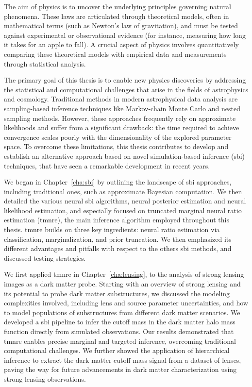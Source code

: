 The aim of physics is to uncover the underlying principles governing natural phenomena. These laws are articulated through theoretical models, often in mathematical terms (such as Newton’s law of gravitation), and must be tested against experimental or observational evidence (for instance, measuring how long it takes for an apple to fall). A crucial aspect of physics involves quantitatively comparing these theoretical models with empirical data and measurements through statistical analysis. 

The primary goal of this thesis is to enable new physics discoveries by addressing the statistical and computational challenges that arise in the fields of astrophysics and cosmology. 
Traditional methods in modern astrophysical data analysis are sampling-based inference techniques like Markov-chain Monte Carlo and nested sampling methods. However, these approaches frequently rely on approximate likelihoods and suffer from a significant drawback: the time required to achieve convergence scales poorly with the dimensionality of the explored parameter space. To overcome these limitations, this thesis contributes to develop and establish an alternative approach based on novel simulation-based inference (\gls*{sbi}) techniques, that have seen a remarkable development in recent years. 

We began in Chapter~\ref{cha:sbi} by outlining the landscape of \gls*{sbi} approaches, including traditional ones, such as approximate Bayesian computation. We then detailed the various neural \gls*{sbi} algorithms, neural posterior estimation and neural likelihood estimation, and especially focused on truncated marginal neural ratio estimation (\gls*{tmnre}), the main inference algorithm employed throughout this thesis. \Gls*{tmnre} builds on three key ingredients: neural ratio estimation via classification, marginalization, and prior truncation. We then emphasized its different advantages and pitfalls with respect to the others \gls*{sbi} methods, and discussed testing strategies.

We first applied \gls*{tmnre} in Chapter~\ref{cha:lensing}, to the analysis of strong lensing images as a dark matter probe. Starting with an overview of strong lensing and its potential to probe dark matter substructures, we discussed the modeling complexities involved, including lens and source parameter uncertainties, and how to model populations of substructures from different dark matter scenarios. We developed a \gls*{sbi} pipeline to infer the cutoff mass in the dark matter halo mass function directly from simulated observations. Our results demonstrated that \gls*{tmnre} enables precise marginal and targeted inference, overcoming traditional computational challenges. We further showed the application of hierarchical inference to extract the dark matter cutoff mass signal from a dataset of lenses, paving the way for future advancements in dark matter characterization using strong lensing observations.

